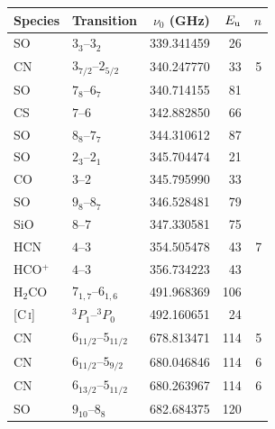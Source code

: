 \begin{tabular}{@{}llr@{\,}rr@{}}
\hline
Species & Transition & $\nu_0$ (GHz) & $E_{\rm u}$ & $n$ \\
\hline
SO & $3_{3}$--$3_{2}$ & 339.341459 & 26 &  \\
CN & $3_{7/2}$--$2_{5/2}$ & 340.247770 & 33 & 5 \\
SO & $7_{8}$--$6_{7}$ & 340.714155 & 81 &  \\
CS & $7$--$6$ & 342.882850 & 66 &  \\
SO & $8_{8}$--$7_{7}$ & 344.310612 & 87 &  \\
SO & $2_{3}$--$2_{1}$ & 345.704474 & 21 &  \\
CO & $3$--$2$ & 345.795990 & 33 &  \\
SO & $9_{8}$--$8_{7}$ & 346.528481 & 79 &  \\
SiO & $8$--$7$ & 347.330581 & 75 &  \\
HCN & $4$--$3$ & 354.505478 & 43 & 7 \\
HCO$^{+}$ & $4$--$3$ & 356.734223 & 43 &  \\
H$_2$CO & $7_{1,7}$--$6_{1,6}$ & 491.968369 & 106 &  \\
{[C\,\textsc{i}]} & $^3P_1$--$^3P_0$ & 492.160651 & 24 &  \\
CN & $6_{11/2}$--$5_{11/2}$ & 678.813471 & 114 & 5 \\
CN & $6_{11/2}$--$5_{9/2}$ & 680.046846 & 114 & 6 \\
CN & $6_{13/2}$--$5_{11/2}$ & 680.263967 & 114 & 6 \\
SO & $9_{10}$--$8_{8}$ & 682.684375 & 120 &  \\
\hline
\end{tabular}%

